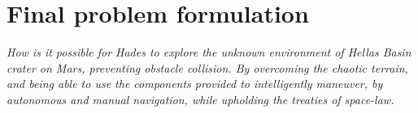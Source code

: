 \chapter{Final problem formulation}\label{ch:finalproblem}
\textit{
How is it possible for Hades to explore the unknown environment of Hellas Basin crater on Mars, preventing obstacle collision. By overcoming the chaotic terrain, and being able to use the components provided to intelligently maneuver, by autonomous and manual navigation, while upholding the treaties of space-law.}
\newline



